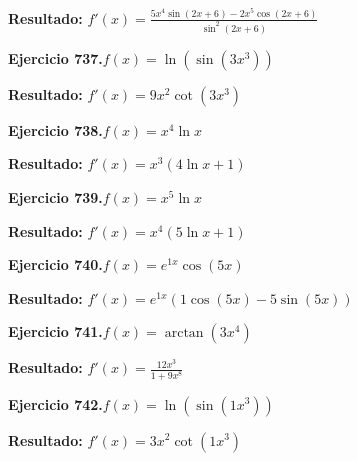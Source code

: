 \documentclass[10pt,a4paper]{article}
\begin{document}
\begin{solbox}
\textbf{Resultado:} \(\displaystyle f'(x) = \frac{5x^{4}\sin(2x +6) - 2x^{5}\cos(2x +6)}{\sin^2(2x +6)}\)
\end{solbox}

\begin{ejbox}
\textbf{Ejercicio 737.}\quad $f(x) = \ln(\sin(3x^{3}))$
\end{ejbox}

\begin{solbox}
\textbf{Resultado:} \(\displaystyle f'(x) = 9x^{2}\cot(3x^{3})\)
\end{solbox}

\begin{ejbox}
\textbf{Ejercicio 738.}\quad $f(x) = x^{4} \ln x$
\end{ejbox}

\begin{solbox}
\textbf{Resultado:} \(\displaystyle f'(x) = x^{3}(4\ln x + 1)\)
\end{solbox}

\newpage
\begin{ejbox}
\textbf{Ejercicio 739.}\quad $f(x) = x^{5} \ln x$
\end{ejbox}

\begin{solbox}
\textbf{Resultado:} \(\displaystyle f'(x) = x^{4}(5\ln x + 1)\)
\end{solbox}

\begin{ejbox}
\textbf{Ejercicio 740.}\quad $f(x) = e^{1x} \cos(5x)$
\end{ejbox}

\begin{solbox}
\textbf{Resultado:} \(\displaystyle f'(x) = e^{1x}(1\cos(5x) - 5\sin(5x))\)
\end{solbox}

\begin{ejbox}
\textbf{Ejercicio 741.}\quad $f(x) = \arctan(3x^{4})$
\end{ejbox}

\begin{solbox}
\textbf{Resultado:} \(\displaystyle f'(x) = \frac{12x^{3}}{1+9x^{8}}\)
\end{solbox}

\newpage
\begin{ejbox}
\textbf{Ejercicio 742.}\quad $f(x) = \ln(\sin(1x^{3}))$
\end{ejbox}

\begin{solbox}
\textbf{Resultado:} \(\displaystyle f'(x) = 3x^{2}\cot(1x^{3})\)
\end{solbox}
\end{document}
